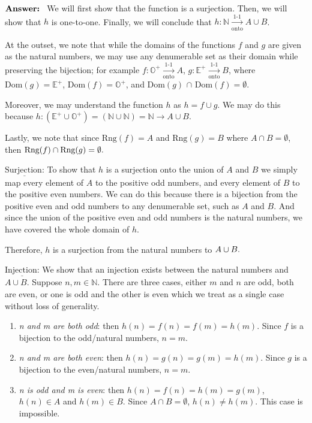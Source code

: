 \documentclass{article}
\newcommand{\OArrow}{\xrightarrow[\text{onto}]{\text{1-1}}}
\begin{document}
$\\ \textbf{Answer: }$ We will first show that the function is a surjection. Then, we will show that $h$ is one-to-one. Finally, we will conclude that $h: \mathbb{N} \OArrow A \cup B$.

At the outset, we note that while the domains of the functions $f$ and $g$ are given as the natural numbers, we may use any denumerable set as their domain while preserving the bijection; for example $f: \mathbb{O^{+}} \OArrow A$, $g: \mathbb{E^{+}} \OArrow B$, where  $\text{Dom}(g) = \mathbb{E^{+}}$, $\text{Dom}(f) = \mathbb{O^{+}}$, and $\text{Dom}(g)$ $ \cap$ $  \text{Dom}(f) = \emptyset$. 

Moreover, we may understand the function $h$ as $h = f \cup g$. We may do this because $h: (\mathbb{E^{+}} \cup \mathbb{O^{+}}) = (\mathbb{N} \cup \mathbb{N}) = \mathbb{N} \rightarrow A \cup B$.

Lastly, we note that since $\text{Rng}(f) = A$ and $\text{Rng}(g) = B$ where $A \cap B = \emptyset$, then $\text{Rng}(f) \cap \text{Rng}(g) = \emptyset. \\$

$\underline{\text{Surjection:}}$ To show that $h$ is a surjection onto the union of $A$ and $B$ we simply map every element of $A$ to the positive odd numbers, and every element of $B$ to the positive even numbers. We can do this because there is a bijection from the positive even and odd numbers to any denumerable set, such as $A$ and $B$. And since the union of the positive even and odd numbers is the natural numbers, we have covered the whole domain of $h$.

Therefore, $h$ is a surjection from the natural numbers to $A \cup B \text{.} \\$

$\underline{\text{Injection:}}$ We show that an injection exists between the natural numbers and $A \cup B$. Suppose $n,m \in \mathbb{N}$. There are three cases, either $m$ and $n$ are odd, both are even, or one is odd and the other is even which we treat as a single case without loss of generality.

\begin{enumerate}
    \item \textit{n and m are both odd}: then $h(n) = f(n) = f(m) = h(m)$. Since $f$ is a bijection to the odd/natural numbers, $n = m$.
    \item \textit{n and m are both even}: then $h(n) = g(n) = g(m) = h(m)$. Since $g$ is a bijection to the even/natural numbers, $n = m$.
    \item \textit{n is odd and m is even}: then $h(n) = f(n) = h(m)= g(m)$,  $h(n) \in A$ and $h(m) \in B$. Since $A \cap B = \emptyset$, $h(n) \neq h(m)$. This case is impossible.
\end{enumerate}
\end{document}
